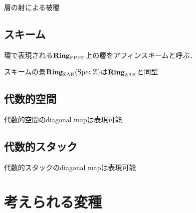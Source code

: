\documentclass[lualatex, ja=standard, a4paper]{bxjsarticle}
\newcommand{\ZAR}   {\Ring_{\mathrm{ZAR}}}
\newcommand{\FPPF}  {\Ring_{\mathrm{FPPF}}}
\begin{document}
\begin{Def}
    層の射による被覆
\end{Def}

\subsection{スキーム}
\begin{Def}
    環で表現される$\FPPF$上の層をアフィンスキームと呼ぶ．
\end{Def}

\begin{Def}[チャート付き層としてのスキーム]
\end{Def}

\begin{Prop}
    スキームの景$\ZAR(\Spec \Z)$は$\ZAR$と同型
\end{Prop}

\subsection{代数的空間}
\begin{Def}[チャート付き層としての代数的空間]
\end{Def}

\begin{Prop}
    代数的空間のdiagonal mapは表現可能
\end{Prop}

\subsection{代数的スタック}
\begin{Def}[チャート付きスタックとしての代数的スタック]
\end{Def}

\begin{Prop}
    代数的スタックのdiagonal mapは表現可能
\end{Prop}

\section{考えられる変種}

\printbibliography[title=参考文献]
\end{document}
